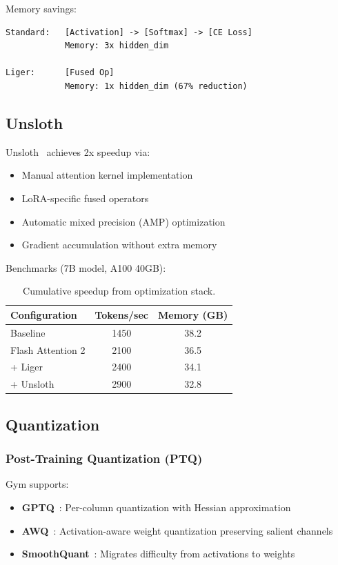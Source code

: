 Memory savings:
\begin{verbatim}
Standard:   [Activation] -> [Softmax] -> [CE Loss]
            Memory: 3x hidden_dim

Liger:      [Fused Op]
            Memory: 1x hidden_dim (67% reduction)
\end{verbatim}

\subsection{Unsloth}

Unsloth~\citep{unsloth2024} achieves 2x speedup via:
\begin{itemize}
\item Manual attention kernel implementation
\item LoRA-specific fused operators
\item Automatic mixed precision (AMP) optimization
\item Gradient accumulation without extra memory
\end{itemize}

Benchmarks (7B model, A100 40GB):
\begin{table}[h]
\centering
\begin{tabular}{lcc}
\toprule
Configuration & Tokens/sec & Memory (GB) \\
\midrule
Baseline & 1450 & 38.2 \\
Flash Attention 2 & 2100 & 36.5 \\
+ Liger & 2400 & 34.1 \\
+ Unsloth & 2900 & 32.8 \\
\bottomrule
\end{tabular}
\caption{Cumulative speedup from optimization stack.}
\end{table}

\subsection{Quantization}

\subsubsection{Post-Training Quantization (PTQ)}

Gym supports:
\begin{itemize}
\item \textbf{GPTQ}~\citep{frantar2023gptq}: Per-column quantization with Hessian approximation
\item \textbf{AWQ}~\citep{lin2023awq}: Activation-aware weight quantization preserving salient channels
\item \textbf{SmoothQuant}~\citep{xiao2023smoothquant}: Migrates difficulty from activations to weights
\end{itemize}

